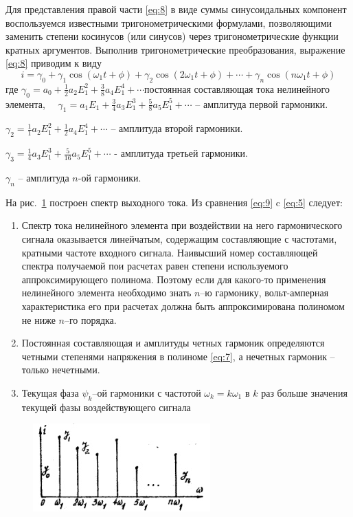 Для представления правой части \eqref{eq:8} в виде суммы синусоидальных компонент воспользуемся известными тригонометрическими формулами, позволяющими заменить степени косинусов (или синусов) через тригонометрические функции кратных аргументов. Выполнив тригонометрические преобразования, выражение \eqref{eq:8} приводим к виду
\begin{equation}
i=\gamma_0+\gamma_1\cos(\omega_1t+\phi)+\gamma_2\cos(2\omega_1t+\phi)+\cdots+
\gamma_n\cos(n\omega_1t+\phi)
\label{eq:9}
\end{equation}
где $\displaystyle \gamma_0=a_0+\frac{1}{2}a_2E_1^2+\frac{3}{8}a_4E_1^4+\cdots$постоянная составляющая тока нелинейного элемента, 
$\gamma_1=a_1E_1+\frac{3}{4}a_3E_1^3+\frac{5}{8}a_5E_1^5+\cdots$ -- амплитуда первой гармоники.

\noindent $\gamma_2=\frac{1}{1}a_2E_1^2+\frac{1}{2}a_4E_1^4+\cdots$ -- амплитуда второй гармоники.

\noindent $\gamma_3=\frac{1}{4}a_3E_1^3+\frac{5}{16}a_5E_1^5+\cdots$ - амплитуда третьей гармоники.

\noindent $\gamma_n$ -- амплитуда $n$-ой гармоники.





На рис.~\ref{pic:3} построен спектр выходного тока. Из сравнения \eqref{eq:9} c \eqref{eq:5} следует:

\begin{enumerate}
	\item Спектр тока нелинейного элемента при воздействии на него гармонического сигнала оказывается линейчатым, содержащим составляющие с частотами, кратными частоте входного сигнала. Наивысший номер составляющей спектра получаемой пои расчетах равен степени используемого аппроксимирующего полинома. Поэтому если для какого-то применения нелинейного элемента необходимо знать $n$--ю гармонику, вольт-амперная характеристика его при расчетах должна быть аппроксимирована полиномом не ниже $n$--го порядка.
	\item Постоянная составляющая и амплитуды четных гармоник определяются четными степенями напряжения в полиноме \eqref{eq:7}, а нечетных гармоник -- только нечетными.
	\item Текущая фаза $\psi_k$--ой гармоники с частотой $\omega_k=k\omega_1$ в $k$ раз больше значения текущей фазы воздействующего сигнала
\end{enumerate}

\begin{figure}
	\centering
	\includegraphics[]{picture/pic3.jpg}
	\caption{}
	\label{pic:3}
\end{figure}

